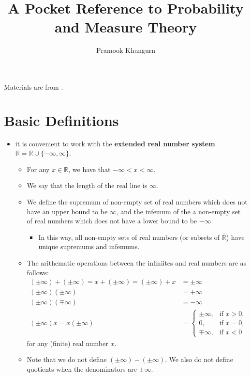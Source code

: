 \documentclass[10pt]{article}
\title{A Pocket Reference to Probability and Measure Theory}
\author{Pramook Khungurn}
\newcommand{\Real}{\mathbb{R}}
\begin{document}
\maketitle

Materials are from \cite{Bartle:1995}.

\section{Basic Definitions}

\begin{itemize}
  \item it is convenient to work with the {\bf extended real number system} $\overline{\Real} = \Real \cup \{-\infty, \infty\}$.
  \begin{itemize}
  \item For any $x \in \Real$, we have that $-\infty < x < \infty$.
  \item We say that the length of the real line is $\infty$.
  \item We define the supremum of non-empty set of real numbers which does not have an upper bound to be $\infty$, and the infemum of the a non-empty set of real numbers which does not have a lower bound to be $-\infty$.
  \begin{itemize}
    \item In this way, all non-empty sets of real numbers (or subsets of $\overline{\Real}$) have unique supremums and infemums.
  \end{itemize}
  \item The arithematic operations between the infiniites and real numbers are as follows:
  \begin{align*}
      (\pm \infty) + (\pm \infty) = x + (\pm \infty) = (\pm \infty) + x &= \pm \infty \\
      (\pm \infty) (\pm \infty) &= +\infty \\
      (\pm \infty) (\mp \infty) &= -\infty \\        
      (\pm \infty) x = x (\pm \infty) &= \begin{cases}
          \pm \infty, & \mbox{if } x > 0, \\
          0, &\mbox{if } x = 0, \\
          \mp \infty, & \mbox{if } x < 0
      \end{cases}        
  \end{align*}
  for any (finite) real number $x$.  
  \item Note that we do not define $(\pm \infty) - (\pm \infty)$. We also do not define quotients when the denominators are $\pm \infty$.  
  \end{itemize}


\end{itemize}
\end{document}
